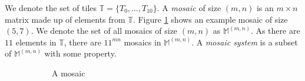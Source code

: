 \documentclass[12pt]{article}
\theoremstyle{plain}
\theoremstyle{definition}
\theoremstyle{remark}
\theoremstyle{definition}
\newcommand{\cell}[4]{ \draw[thick] ( #1 , #2 ) rectangle ( #3 , #4 );}
\newcommand{\cellA}[4]{\draw[red, thick, densely dotted] ( #1 + 0.5 , #2 ) arc(0:90:{0.5}); \draw[thick] ( #1 , #2 ) rectangle ( #3 , #4 );}
\newcommand{\cellB}[4]{\draw[red, thick, densely dotted] ( #1 + 1 , #2 + 0.5 ) arc(90:180:{0.5}); \draw[thick] ( #1 , #2 ) rectangle ( #3 , #4 );}
\newcommand{\cellC}[4]{\draw[red, thick, densely dotted] ( #1 + 0.5, #2 + 1 ) arc(180:270:{0.5}); \draw[thick] ( #1 , #2 ) rectangle ( #3 , #4 );}
\newcommand{\cellD}[4]{\draw[red, thick, densely dotted] ( #1 , #2 + 0.5 ) arc(-90:0:{0.5}); \draw[thick] ( #1 , #2 ) rectangle ( #3 , #4 );}
\newcommand{\cellE}[4]{\draw[red, thick, densely dotted] (#3, #4 * 0.5 + #2 * 0.5) -- (#1, #4 * 0.5 + #2 * 0.5); \draw[thick] ( #1 , #2 ) rectangle ( #3 , #4 );}
\newcommand{\cellF}[4]{\draw[red, thick, densely dotted] (#3 * 0.5 + #1 * 0.5 , #2) -- (#3 * 0.5 + #1 * 0.5 , #4); \draw[thick] ( #1 , #2 ) rectangle ( #3 , #4 );}
\newcommand{\cellG}[4]{\draw[red, thick, densely dotted] ( #1 + 0.5 , #2 ) arc(0:90:{0.5}); \draw[red, thick, densely dotted] ( #1 + 0.5, #2 + 1 ) arc(180:270:{0.5}); \draw[thick] ( #1 , #2 ) rectangle ( #3 , #4 );}
\newcommand{\cellH}[4]{\draw[red, thick, densely dotted] ( #1 , #2 + 0.5 ) arc(-90:0:{0.5}); \draw[red, thick, densely dotted] ( #1 + 1 , #2 + 0.5 ) arc(90:180:{0.5}); \draw[thick] ( #1 , #2 ) rectangle ( #3 , #4 );}
\newcommand{\cellI}[4]{\draw[red, thick, densely dotted] (#3 * 0.5 + #1 * 0.5 , #2) -- (#3 * 0.5 + #1 * 0.5 , #4); \node[shape=circle,draw=none,fill=white, inner sep=3pt,minimum size=5pt] (A) at ( #1 + 0.5 , #2 + 0.5 ) {}; \draw[red, thick, densely dotted] (#3, #4 * 0.5 + #2 * 0.5) -- (#1, #4 * 0.5 + #2 * 0.5); \draw[thick] ( #1 , #2 ) rectangle ( #3 , #4 );}
\newcommand{\cellJ}[4]{\draw[red, thick, densely dotted] (#3, #4 * 0.5 + #2 * 0.5) -- (#1, #4 * 0.5 + #2 * 0.5); \node[shape=circle,draw=none,fill=white, inner sep=3pt,minimum size=5pt] (A) at ( #1 + 0.5 , #2 + 0.5 ) {}; \draw[thick] ( #1 , #2 ) rectangle ( #3 , #4 ); \draw[red, thick, densely dotted] (#3 * 0.5 + #1 * 0.5 , #2) -- (#3 * 0.5 + #1 * 0.5 , #4);}
\newcommand{\cellAf}[4]{\filldraw[gray!40] ( #1 , #2 ) rectangle ( #3 , #4 ); \draw[red, thick, densely dotted] ( #1 + 0.5 , #2 ) arc(0:90:{0.5}); \draw[thick] ( #1 , #2 ) rectangle ( #3 , #4 );}
\newcommand{\cellBf}[4]{\filldraw[gray!40] ( #1 , #2 ) rectangle ( #3 , #4 ); \draw[red, thick, densely dotted] ( #1 + 1 , #2 + 0.5 ) arc(90:180:{0.5}); \draw[thick] ( #1 , #2 ) rectangle ( #3 , #4 );}
\newcommand{\cellCf}[4]{\filldraw[gray!40] ( #1 , #2 ) rectangle ( #3 , #4 ); \draw[red, thick, densely dotted] ( #1 + 0.5, #2 + 1 ) arc(180:270:{0.5}); \draw[thick] ( #1 , #2 ) rectangle ( #3 , #4 );}
\newcommand{\cellDf}[4]{\filldraw[gray!40] ( #1 , #2 ) rectangle ( #3 , #4 ); \draw[red, thick, densely dotted] ( #1 , #2 + 0.5 ) arc(-90:0:{0.5}); \draw[thick] ( #1 , #2 ) rectangle ( #3 , #4 );}
\newcommand{\cellEf}[4]{\filldraw[gray!40] ( #1 , #2 ) rectangle ( #3 , #4 ); \draw[red, thick, densely dotted] (#3, #4 * 0.5 + #2 * 0.5) -- (#1, #4 * 0.5 + #2 * 0.5); \draw[thick] ( #1 , #2 ) rectangle ( #3 , #4 );}
\newcommand{\cellFf}[4]{\filldraw[gray!40] ( #1 , #2 ) rectangle ( #3 , #4 ); \draw[red, thick, densely dotted] (#3 * 0.5 + #1 * 0.5 , #2) -- (#3 * 0.5 + #1 * 0.5 , #4); \draw[thick] ( #1 , #2 ) rectangle ( #3 , #4 );}
\newcommand{\cellIf}[4]{\filldraw[gray!40] ( #1 , #2 ) rectangle ( #3 , #4 ); \draw[red, thick, densely dotted] (#3 * 0.5 + #1 * 0.5 , #2) -- (#3 * 0.5 + #1 * 0.5 , #4); \node[shape=circle,draw=none,fill=gray!40, inner sep=3pt,minimum size=5pt] (A) at ( #1 + 0.5 , #2 + 0.5 ) {}; \draw[red, thick, densely dotted] (#3, #4 * 0.5 + #2 * 0.5) -- (#1, #4 * 0.5 + #2 * 0.5); \draw[thick] ( #1 , #2 ) rectangle ( #3 , #4 );}
\begin{document}
We denote the set of tiles $\mathbb{T}=\{T_0, \dots, T_{10}\}$. A \textit{mosaic} of size $(m,n)$ is an $m \times n$ matrix made up of elements from $\mathbb{T}$. Figure \ref{fig:example mosaic} shows an example mosaic of size $(5,7)$. We denote the set of all mosaics of size $(m,n)$ as $\mathbb{M}^{(m,n)}$. As there are $11$ elements in $\mathbb{T}$, there are $11^{mn}$ mosaics in $\mathbb{M}^{(m,n)}$. A \textit{mosaic system} is a subset of $\mathbb{M}^{(m,n)}$ with some property. 

\begin{figure}[h!]
    \begin{center}
    \begin{subfigure}{0.4\textwidth}
    \caption{A mosaic}
    \label{fig:example mosaic}
    \end{subfigure}
\hspace{0.05\textwidth}
\begin{subfigure}{0.4\textwidth}
\end{subfigure}
\end{center}
\end{figure}
\end{document}
